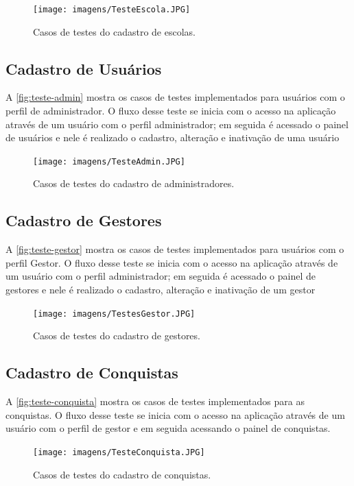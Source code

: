 \begin{figure}[htb]
    \centering
	\texttt{[image: imagens/TesteEscola.JPG]}
	\caption{\label{fig:teste-escola} Casos de testes do cadastro de escolas.}
\end{figure}

\subsection{Cadastro de Usuários}
A \autoref{fig:teste-admin} mostra os casos de testes implementados para usuários com o perfil de administrador. O fluxo desse teste se inicia com o acesso na aplicação através de um usuário com o perfil administrador; em seguida é acessado o painel de usuários e nele é realizado o cadastro, alteração e inativação de uma usuário

\begin{figure}[htb]
    \centering
	\texttt{[image: imagens/TesteAdmin.JPG]}
	\caption{\label{fig:teste-admin} Casos de testes do cadastro de administradores.}
\end{figure}

\subsection{Cadastro de Gestores}
A \autoref{fig:teste-gestor} mostra os casos de testes implementados para usuários com o perfil Gestor. O fluxo desse teste se inicia com o acesso na aplicação através de um usuário com o perfil administrador; em seguida é acessado o painel de gestores e nele é realizado o cadastro, alteração e inativação de um gestor

\begin{figure}[htb]
    \centering
	\texttt{[image: imagens/TestesGestor.JPG]}
	\caption{\label{fig:teste-gestor} Casos de testes do cadastro de gestores.}
\end{figure}


\subsection{Cadastro de Conquistas}
A \autoref{fig:teste-conquista} mostra os casos de testes implementados para as conquistas. O fluxo desse teste se inicia com o acesso na aplicação através de um usuário com o perfil de gestor e em seguida acessando o painel de  conquistas. 

\begin{figure}[htb]
    \centering
	\texttt{[image: imagens/TesteConquista.JPG]}
	\caption{\label{fig:teste-conquista} Casos de testes do cadastro de conquistas.}
\end{figure}

